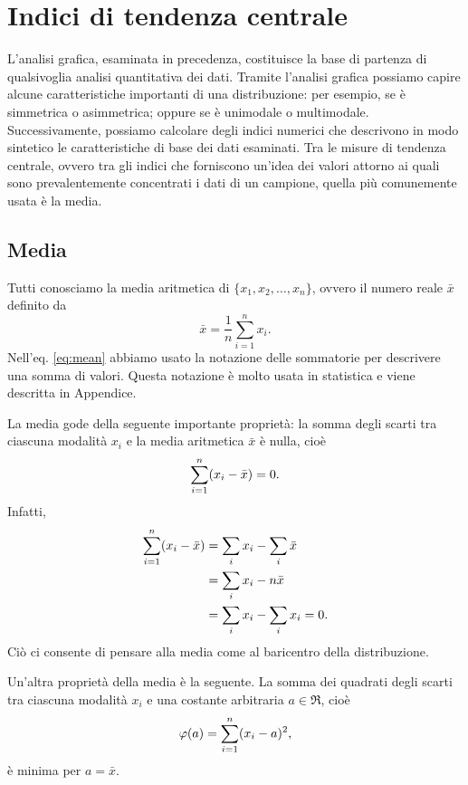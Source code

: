 \documentclass[
  10pt,
  italian,
  a4paper,
  extrafontsizes,onecolumn,openright
  ]{memoir}
\theoremstyle{definition}
\theoremstyle{definition}
\theoremstyle{definition}
\theoremstyle{definition}
\theoremstyle{remark}
\begin{document}
\hypertarget{indici-di-tendenza-centrale}{%
\section{Indici di tendenza centrale}\label{indici-di-tendenza-centrale}}

L'analisi grafica, esaminata in precedenza, costituisce la base di
partenza di qualsivoglia analisi quantitativa dei dati. Tramite
l'analisi grafica possiamo capire alcune caratteristiche importanti di
una distribuzione: per esempio, se è simmetrica o asimmetrica; oppure se
è unimodale o multimodale. Successivamente, possiamo calcolare degli
indici numerici che descrivono in modo sintetico le caratteristiche di
base dei dati esaminati. Tra le misure di tendenza centrale, ovvero tra
gli indici che forniscono un'idea dei valori attorno ai quali sono
prevalentemente concentrati i dati di un campione, quella più
comunemente usata è la media.

\hypertarget{media}{%
\subsection{Media}\label{media}}

Tutti conosciamo la media aritmetica di \(\{x_1, x_2, \dots, x_n\}\),
ovvero il numero reale \(\bar{x}\) definito da
\begin{equation}
\bar{x}=\frac{1}{n}\sum_{i=1}^n x_i.
\label{eq:mean}
\end{equation}
Nell'eq. \eqref{eq:mean} abbiamo usato la notazione delle sommatorie
per descrivere una somma di valori. Questa notazione è molto usata in
statistica e viene descritta in Appendice.

La media gode della seguente importante proprietà: la somma degli scarti
tra ciascuna modalità \(x_i\) e la media aritmetica \(\bar{x}\) è nulla,
cioè
\[
\sum_{i=1}^n (x_i - \bar{x}) = 0.\notag
\label{eq:diffmeansumzero}\] Infatti, \[\begin{aligned}
\sum_{i=1}^n (x_i - \bar{x}) &= \sum_i x_i - \sum_i \bar{x}\notag\\
&= \sum_i x_i - n \bar{x}\notag\\
&= \sum_i x_i - \sum_i x_i = 0.\notag\end{aligned}
\]
Ciò ci consente di pensare alla media come al baricentro della distribuzione.

Un'altra proprietà della media è la seguente. La somma dei quadrati
degli scarti tra ciascuna modalità \(x_i\) e una costante arbitraria
\(a \in \Re\), cioè \[\varphi(a) = \sum_{i=1}^n (x_i - a)^2,\notag\] è
minima per \(a = \bar{x}\).
\end{document}

